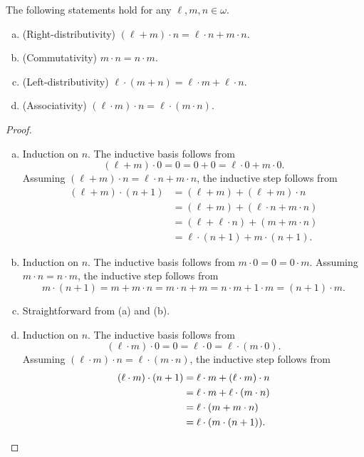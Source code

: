 \documentclass[11pt]{article}
\begin{document}
\begin{theorem}
  The following statements hold for any $\ell, m, n \in \omega$.
  \begin{enumerate}[(a)]
    \item (Right-distributivity) $(\ell + m) \cdot n = \ell \cdot n + m \cdot n$.
    \item (Commutativity) $m \cdot n = n \cdot m$.
    \item (Left-distributivity) $\ell \cdot (m + n) = \ell \cdot m + \ell \cdot n$.
    \item (Associativity) $(\ell \cdot m) \cdot n = \ell \cdot (m \cdot n)$.
  \end{enumerate}
\end{theorem}
\begin{proof}
  \leavevmode
  \begin{enumerate}[(a)]
    \item Induction on $n$.
    The inductive basis follows from
    \begin{equation*}
      (\ell + m) \cdot 0 = 0 = 0 + 0 = \ell \cdot 0 + m \cdot 0.
    \end{equation*}
    Assuming $(\ell + m) \cdot n = \ell \cdot n + m \cdot n$, the inductive step follows from
    \begin{align*}
      (\ell + m) \cdot (n + 1)
      &= (\ell + m) + (\ell + m) \cdot n \\
      &= (\ell + m) + (\ell \cdot n + m \cdot n) \\
      &= (\ell + \ell \cdot n) + (m + m \cdot n) \\
      &= \ell \cdot (n + 1) + m \cdot (n + 1).
    \end{align*}
    \item Induction on $n$.
    The inductive basis follows from $m \cdot 0 = 0 = 0 \cdot m$.
    Assuming $m \cdot n = n \cdot m$, the inductive step follows from
    \begin{equation*}
      m \cdot (n + 1)
      = m + m \cdot n
      = m \cdot n + m
      = n \cdot m + 1 \cdot m
      = (n + 1) \cdot m.
    \end{equation*}
    \item Straightforward from (a) and (b).
    \item Induction on $n$.
    The inductive basis follows from
    \begin{equation*}
      (\ell \cdot m) \cdot 0
      = 0
      = \ell \cdot 0
      = \ell \cdot (m \cdot 0).
    \end{equation*}
    Assuming $(\ell \cdot m) \cdot n = \ell \cdot (m \cdot n)$, the inductive step follows from
    \begin{align*}
      (\ell \cdot m) \cdot (n + 1)
      &= \ell \cdot m + (\ell \cdot m) \cdot n \\
      &= \ell \cdot m + \ell \cdot (m \cdot n) \\
      &= \ell \cdot (m + m \cdot n) \\
      &= \ell \cdot (m \cdot (n + 1)).
      \qedhere
    \end{align*}
  \end{enumerate}
\end{proof}
\end{document}
